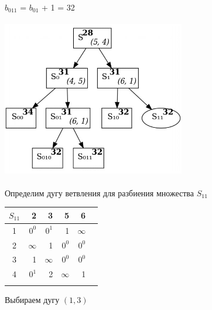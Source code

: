 \documentclass[12pt]{article}
\begin{document}
$b_{011}$ = $b_{01}$ + 1 = 32\\
\begin{flushleft}
 
\includegraphics[width = 8cm, height = 7cm]{pictures/picture_11.jpg}\\
\end{flushleft}
\vspace{3cm}
\begin{flushleft}
 
Определим дугу ветвления для разбиения множества $S_{11}$\\
\end{flushleft}

\begin{flushleft}
\begin{tabular}{c||rrrr||c}
$S_{11}$ & 2 & 3 & 5 & 6 & \\
\hline
\hline
1 &  $0^0$ & $0^1$  & 1 & $\infty$ & \\
2 &  $\infty$ & 1  & $0^0$ & $0^0$ & \\
3 &  1 & $\infty$  & $0^0$ & $0^0$ & \\
4 &  $0^1$ & 2  & $\infty$ & 1 & \\
\hline
\hline
 &  &  &  & & \\
\end{tabular}
\end{flushleft}

Выбираем дугу $(1,3)$
\end{document}
